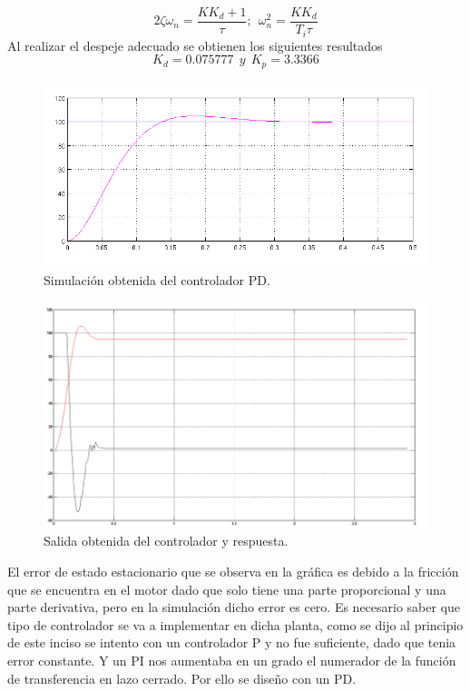 \documentclass[twocolumn]{IEEEtran}
\begin{document}
\begin{equation}
 2\zeta \omega _n  = \frac{{K K_d  + 1}}{\tau } ;\ \ \omega _n ^2  = \frac{{K K_d }}{{T_i \tau }}
\label{ecu111}
\end{equation}
\noindent
Al realizar el despeje adecuado se obtienen los siguientes resultados
\begin{equation}
 K_d = 0.075777\ \ y\ \ K_p = 3.3366
\label{ecu112}
\end{equation}
\begin{figure}[H]
	\centering
		\includegraphics[scale=0.43]{practica4.png}
	\caption{Simulación obtenida del controlador PD.}
	\label{fig15}
\end{figure}
\begin{figure}[H]
	\centering
		\includegraphics[scale=0.27]{ultima.png}
	\caption{Salida obtenida del controlador y respuesta.}
	\label{fig20}
\end{figure}
\noindent
El error de estado estacionario que se observa en la gráfica es debido a la fricción que se encuentra en el motor dado que solo tiene una parte proporcional y una parte derivativa, pero en la simulación dicho error es cero. Es necesario saber que tipo de controlador se va a implementar en dicha planta, como se dijo al principio de este inciso se intento con un controlador P y no fue suficiente, dado que tenia error constante. Y un PI nos aumentaba en un grado el numerador de la función de transferencia en lazo cerrado. Por ello se diseño con un PD.
\end{document}
